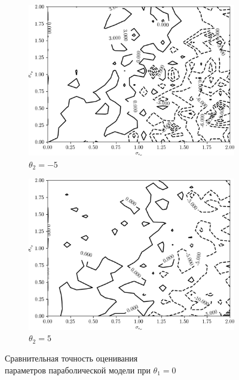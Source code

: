 \begin{figure}[p]
  \begin{subfigure}[b]{\linewidth}
    \centering
    \includegraphics[width=135mm]{fig/nonlinear/quadratic/a-0_b-0_c--5.png}
    \caption{\( \theta_2 = -5 \)}
  \end{subfigure}

  \vspace{2\baselineskip}
  \begin{subfigure}[b]{\linewidth}
    \centering
    \includegraphics[width=135mm]{fig/nonlinear/quadratic/a-0_b-0_c-5.png}
    \caption{\( \theta_2 = 5 \)}
  \end{subfigure}

  \vspace{\baselineskip}
    \caption{
      Сравнительная точность оценивания \\
      параметров параболической модели при \( \theta_1 = 0 \)
    }\label{fig:comparison_nonlinear_quadratic_b-0}
\end{figure}

